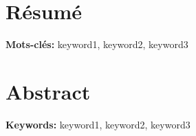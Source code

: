 \section*{Résumé}

\lipsum[3]

\vspace{0.3cm}
\textbf{Mots-clés: }keyword1, keyword2, keyword3

\vfill

\section*{Abstract}

\lipsum[4]

\vspace{0.3cm}
\textbf{Keywords: }keyword1, keyword2, keyword3

\vfill

\newpage